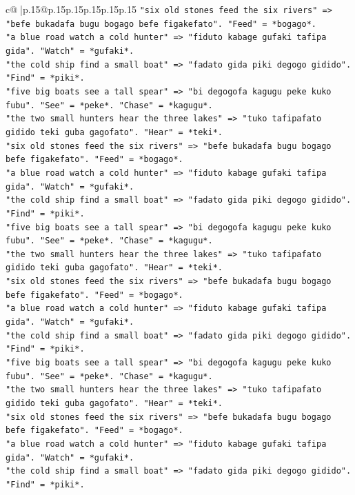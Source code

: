 \documentclass{article}
\begin{document}
{\begin{supertabular}{c@{$\;$}|p{.15\linewidth}@{}p{.15\linewidth}p{.15\linewidth}p{.15\linewidth}p{.15\linewidth}p{.15\linewidth}}
{{{\texttt{"six old stones feed the six rivers" => "befe bukadafa bugu bogago befe figakefato". "Feed" = *bogago*.} \\
\texttt{"a blue road watch a cold hunter" => "fiduto kabage gufaki tafipa gida". "Watch" = *gufaki*.} \\
\texttt{"the cold ship find a small boat" => "fadato gida piki degogo gidido". "Find" = *piki*.} \\
\texttt{"five big boats see a tall spear" => "bi degogofa kagugu peke kuko fubu". "See" = *peke*. "Chase" = *kagugu*.} \\
\texttt{"the two small hunters hear the three lakes" => "tuko tafipafato gidido teki guba gagofato". "Hear" = *teki*.} \\
\texttt{"six old stones feed the six rivers" => "befe bukadafa bugu bogago befe figakefato". "Feed" = *bogago*.} \\
\texttt{"a blue road watch a cold hunter" => "fiduto kabage gufaki tafipa gida". "Watch" = *gufaki*.} \\
\texttt{"the cold ship find a small boat" => "fadato gida piki degogo gidido". "Find" = *piki*.} \\
\texttt{"five big boats see a tall spear" => "bi degogofa kagugu peke kuko fubu". "See" = *peke*. "Chase" = *kagugu*.} \\
\texttt{"the two small hunters hear the three lakes" => "tuko tafipafato gidido teki guba gagofato". "Hear" = *teki*.} \\
\texttt{"six old stones feed the six rivers" => "befe bukadafa bugu bogago befe figakefato". "Feed" = *bogago*.} \\
\texttt{"a blue road watch a cold hunter" => "fiduto kabage gufaki tafipa gida". "Watch" = *gufaki*.} \\
\texttt{"the cold ship find a small boat" => "fadato gida piki degogo gidido". "Find" = *piki*.} \\
\texttt{"five big boats see a tall spear" => "bi degogofa kagugu peke kuko fubu". "See" = *peke*. "Chase" = *kagugu*.} \\
\texttt{"the two small hunters hear the three lakes" => "tuko tafipafato gidido teki guba gagofato". "Hear" = *teki*.} \\
\texttt{"six old stones feed the six rivers" => "befe bukadafa bugu bogago befe figakefato". "Feed" = *bogago*.} \\
\texttt{"a blue road watch a cold hunter" => "fiduto kabage gufaki tafipa gida". "Watch" = *gufaki*.} \\
\texttt{"the cold ship find a small boat" => "fadato gida piki degogo gidido". "Find" = *piki*.} \\
}}}
\end{supertabular}}
\end{document}
